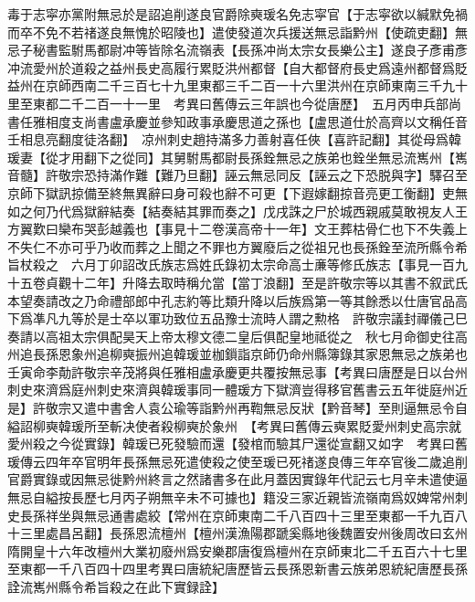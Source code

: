 毒于志寜亦黨附無忌於是詔追削遂良官爵除奭瑗名免志寜官【于志寜欲以緘默免禍而卒不免不若禇遂良無愧於昭陵也】遣使發道次兵援送無忌詣黔州【使疏吏翻】無忌子秘書監駙馬都尉冲等皆除名流嶺表【長孫冲尚太宗女長樂公主】遂良子彥甫彥冲流愛州於道殺之益州長史高履行累貶洪州都督【自大都督府長史爲遠州都督爲貶益州在京師西南二千三百七十九里東都三千二百一十六里洪州在京師東南三千九十里至東都二千二百一十一里　考異曰舊傳云三年誤也今從唐歷】　五月丙申兵部尚書任雅相度支尚書盧承慶並參知政事承慶思道之孫也【盧思道仕於高齊以文稱任音壬相息亮翻度徒洛翻】　凉州刺史趙持滿多力善射喜任俠【喜許記翻】其從母爲韓瑗妻【從才用翻下之從同】其舅駙馬都尉長孫銓無忌之族弟也銓坐無忌流嶲州【嶲音髓】許敬宗恐持滿作難【難乃旦翻】誣云無忌同反【誣云之下恐脱與字】驛召至京師下獄訊掠備至終無異辭曰身可殺也辭不可更【下遐嫁翻掠音亮更工衡翻】吏無如之何乃代爲獄辭結奏【結奏結其罪而奏之】戊戌誅之尸於城西親戚莫敢視友人王方翼歎曰欒布哭彭越義也【事見十二卷漢高帝十一年】文王葬枯骨仁也下不失義上不失仁不亦可乎乃收而葬之上聞之不罪也方翼廢后之從祖兄也長孫銓至流所縣令希旨杖殺之　六月丁卯詔改氏族志爲姓氏錄初太宗命高士亷等修氏族志【事見一百九十五卷貞觀十二年】升降去取時稱允當【當丁浪翻】至是許敬宗等以其書不叙武氏本望奏請改之乃命禮部郎中孔志約等比類升降以后族爲第一等其餘悉以仕唐官品高下爲凖凡九等於是士卒以軍功致位五品豫士流時人謂之勲格　許敬宗議封禪儀己巳奏請以高祖太宗俱配昊天上帝太穆文德二皇后俱配皇地祗從之　秋七月命御史往高州追長孫恩象州追柳奭振州追韓瑗並枷鎻詣京師仍命州縣簿錄其家恩無忌之族弟也壬寅命李勣許敬宗辛茂將與任雅相盧承慶更共覆按無忌事【考異曰唐歷是日以台州刺史來濟爲庭州刺史來濟與韓瑗事同一體瑗方下獄濟豈得移官舊書云五年徙庭州近是】許敬宗又遣中書舍人袁公瑜等詣黔州再鞫無忌反狀【黔音琴】至則逼無忌令自縊詔柳奭韓瑗所至斬决使者殺柳奭於象州　【考異曰舊傳云奭累貶愛州刺史高宗就愛州殺之今從實錄】韓瑗已死發驗而還【發棺而驗其尸還從宣翻又如字　考異曰舊瑗傳云四年卒官明年長孫無忌死遣使殺之使至瑗已死禇遂良傳三年卒官後二歲追削官爵實錄或因無忌徙黔州終言之然諸書多在此月蓋因實錄年代記云七月辛未遣使逼無忌自縊按長歷七月丙子朔無辛未不可據也】籍没三家近親皆流嶺南爲奴婢常州刺史長孫祥坐與無忌通書處絞【常州在京師東南二千八百四十三里至東都一千九百八十三里處昌呂翻】長孫恩流檀州【檀州漢漁陽郡蹏奚縣地後魏置安州後周改曰玄州隋開皇十六年改檀州大業初廢州爲安樂郡唐復爲檀州在京師東北二千五百六十七里至東都一千八百四十四里考異曰唐統紀唐歷皆云長孫恩新書云族弟恩統紀唐歷長孫詮流嶲州縣令希旨殺之在此下實録詮】

